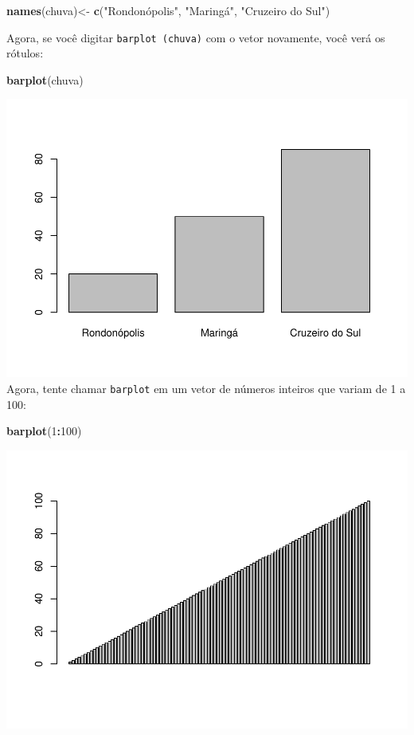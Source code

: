 \documentclass[]{book}
\newenvironment{Shaded}{\begin{snugshade}}{\end{snugshade}}
\newcommand{\DecValTok}[1]{\textcolor[rgb]{0.00,0.00,0.81}{#1}}
\newcommand{\KeywordTok}[1]{\textcolor[rgb]{0.13,0.29,0.53}{\textbf{#1}}}
\newcommand{\NormalTok}[1]{#1}
\newcommand{\OperatorTok}[1]{\textcolor[rgb]{0.81,0.36,0.00}{\textbf{#1}}}
\newcommand{\StringTok}[1]{\textcolor[rgb]{0.31,0.60,0.02}{#1}}
\begin{document}
\begin{Shaded}
\begin{Highlighting}[]
\KeywordTok{names}\NormalTok{(chuva)<-}\StringTok{ }\KeywordTok{c}\NormalTok{(}\StringTok{"Rondonópolis", "}\NormalTok{Maringá}\StringTok{", "}\NormalTok{Cruzeiro do Sul}\StringTok{")}
\end{Highlighting}
\end{Shaded}

Agora, se você digitar \texttt{barplot\ (chuva)} com o vetor novamente, você verá os rótulos:

\begin{Shaded}
\begin{Highlighting}[]
\KeywordTok{barplot}\NormalTok{(chuva)}
\end{Highlighting}
\end{Shaded}

\includegraphics{TudodoR_files/figure-latex/unnamed-chunk-34-1.pdf}
Agora, tente chamar \texttt{barplot} em um vetor de números inteiros que variam de 1 a 100:

\begin{Shaded}
\begin{Highlighting}[]
\KeywordTok{barplot}\NormalTok{(}\DecValTok{1}\OperatorTok{:}\DecValTok{100}\NormalTok{)}
\end{Highlighting}
\end{Shaded}

\includegraphics{TudodoR_files/figure-latex/unnamed-chunk-35-1.pdf}
\end{document}
